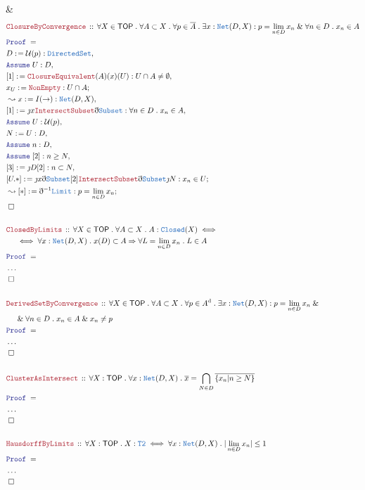 \documentclass[12pt]{scrartcl}
\newcommand{\TYPE}[1]{\textcolor{NavyBlue}{\mathtt{#1}}}
\newcommand{\LOGIC}[1]{\textcolor{Blue}{\mathtt{#1}}}
\newcommand{\THM}[1]{\textcolor{Maroon}{\mathtt{#1}}}
\renewcommand{\.}{\; . \;}
\newcommand{\de}{: \kern 0.1pc =}
\newcommand{\Theorem}[2]{& \THM{#1} \, :: \, #2 \\ & \Proof = \\ }
\newcommand{\NewLine}{\\ & \kern 1pc}
\newcommand{\Page}[1]{ \begin{align*} #1 \end{align*}   }
\newcommand{ \bd }{ \ByDef }
\newcommand{\NoProof}{ & \ldots \\ \EndProof}
\renewcommand{\And}{\; \& \;}
\newcommand{\Imply}{\Rightarrow}
\newcommand{\Say}[3]{& #1 \de #2 : #3, \\}
\newcommand{\Conclude}[3]{& #1 \de #2 : #3; \\}
\newcommand{\Derive}[3]{& \leadsto #1 \de #2 : #3, \\}
\newcommand{\DeriveConclude}[3]{& \leadsto #1 \de #2 : #3 ; \\}
\newcommand{\Assume}[2]{& \LOGIC{Assume} \; #1 : #2, \\}
\newcommand{\QED}{\; \square}
\newcommand{\EndProof}{& \QED \\}
\newcommand{\ByDef}{\eth}
\newcommand{\ByConstr}{\jmath}
\newcommand{\Proof}{\LOGIC{Proof} \; }
\newcommand{\TOP}{\mathsf{TOP}}
\renewcommand{\U}{\mathcal{U}}
\renewcommand{\d}{\mathrm{d}}
\begin{document}
{{	}
	\EndProof
}\Page{
	\Theorem{ClosureByConvergence}
	{
		\forall X \in \TOP \.
		\forall A \subset X \.
		\forall p \in \overline{A} \.
		\exists x : \TYPE{Net}(D,X) :
		p = \lim_{n \in D} x_n \And \forall n \in D \. x_n \in A
	}
	\Say{D}{\U(p)}{\TYPE{DirectedSet}}
	\Assume{U}{D}
	\Say{[1]}{\THM{ClosureEquivalent}(A)(x)(U)}{ U \cap A \neq \emptyset}
	\Conclude{x_U}{\THM{NonEmpty}}{ U \cap A  }
	\Derive{x}{I(\to)}{\TYPE{Net}(D,X)}
	\Say{[1]}{\ByConstr x \THM{IntersectSubset} \bd \TYPE{Subset}}{ \forall n \in D \. x_n \in A  }
	\Assume{U}{\U(p)}
	\Say{N}{U}{D}
	\Assume{n}{D}
	\Assume{[2]}{n \ge N}
	\Say{[3]}{\ByConstr D[2]}{n \subset N}
	\Conclude{[U.*]}{\ByConstr x \bd \TYPE{Subset} [2] \THM{IntersectSubset} \bd \TYPE{Subset}\ByConstr N}
	{
		x_n \in U                                 
	}
	\DeriveConclude{[*]}{\bd^{-1} \TYPE{Limit}}{p = \lim_{n \in D} x_n }
	\EndProof
	\\
	\Theorem{ClosedByLimits}
	{
		\forall X \in \TOP \.
		\forall A \subset X \.
		A : \TYPE{Closed}(X) 
		\iff \NewLine \iff
		\forall x : \TYPE{Net}(D,X) \. x(D) \subset A \Imply  \forall L = \lim_{n \in D} x_n \. L \in A
	}
	\NoProof
	\\
	\Theorem{DerivedSetByConvergence}
	{
		\forall X \in \TOP \.
		\forall A \subset X \.
		\forall p \in A^\d \.
		\exists x : \TYPE{Net}(D,X) :
		p = \lim_{n \in D} x_n \And 
		\NewLine \And
		\forall n \in D \. x_n \in A \And x_n \neq p
	}
	\NoProof
	\\
	\Theorem{ClusterAsIntersect}
	{
		\forall X : \TOP \.
		\forall x : \TYPE{Net}(D,X) \. 
		\overline{x} = \bigcap_{N \in D} \overline{\{ x_n | n \ge N \}}
	}
	\NoProof
	\\
	\Theorem{HausdorffByLimits}
	{
		\forall X : \TOP \.
		X : \TYPE{T2} \iff \forall x : \TYPE{Net}(D,X) \. |\lim_{n \in D} x_n| \le 1
	}
	\NoProof
}
\newpage
\end{document}
